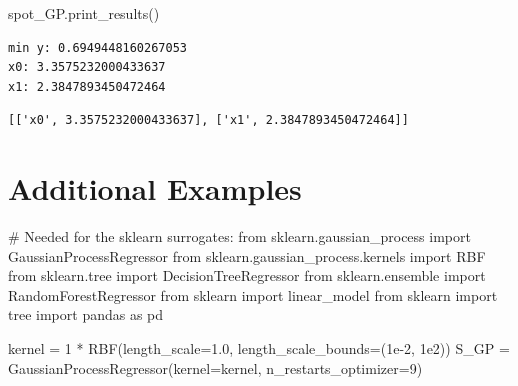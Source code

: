 \documentclass[
  letterpaper,
  DIV=11,
  numbers=noendperiod]{scrreprt}
\newenvironment{Shaded}{\begin{snugshade}}{\end{snugshade}}
\newcommand{\CommentTok}[1]{\textcolor[rgb]{0.37,0.37,0.37}{#1}}
\newcommand{\DecValTok}[1]{\textcolor[rgb]{0.68,0.00,0.00}{#1}}
\newcommand{\FloatTok}[1]{\textcolor[rgb]{0.68,0.00,0.00}{#1}}
\newcommand{\ImportTok}[1]{\textcolor[rgb]{0.00,0.46,0.62}{#1}}
\newcommand{\NormalTok}[1]{\textcolor[rgb]{0.00,0.23,0.31}{#1}}
\newcommand{\OperatorTok}[1]{\textcolor[rgb]{0.37,0.37,0.37}{#1}}
\begin{document}
\begin{Shaded}
\begin{Highlighting}[]
\NormalTok{spot\_GP.print\_results()}
\end{Highlighting}
\end{Shaded}

\begin{verbatim}
min y: 0.6949448160267053
x0: 3.3575232000433637
x1: 2.3847893450472464
\end{verbatim}

\begin{verbatim}
[['x0', 3.3575232000433637], ['x1', 2.3847893450472464]]
\end{verbatim}

\hypertarget{additional-examples}{%
\section{Additional Examples}\label{additional-examples}}

\begin{Shaded}
\begin{Highlighting}[]
\CommentTok{\# Needed for the sklearn surrogates:}
\ImportTok{from}\NormalTok{ sklearn.gaussian\_process }\ImportTok{import}\NormalTok{ GaussianProcessRegressor}
\ImportTok{from}\NormalTok{ sklearn.gaussian\_process.kernels }\ImportTok{import}\NormalTok{ RBF}
\ImportTok{from}\NormalTok{ sklearn.tree }\ImportTok{import}\NormalTok{ DecisionTreeRegressor}
\ImportTok{from}\NormalTok{ sklearn.ensemble }\ImportTok{import}\NormalTok{ RandomForestRegressor}
\ImportTok{from}\NormalTok{ sklearn }\ImportTok{import}\NormalTok{ linear\_model}
\ImportTok{from}\NormalTok{ sklearn }\ImportTok{import}\NormalTok{ tree}
\ImportTok{import}\NormalTok{ pandas }\ImportTok{as}\NormalTok{ pd}
\end{Highlighting}
\end{Shaded}

\begin{Shaded}
\begin{Highlighting}[]
\NormalTok{kernel }\OperatorTok{=} \DecValTok{1} \OperatorTok{*}\NormalTok{ RBF(length\_scale}\OperatorTok{=}\FloatTok{1.0}\NormalTok{, length\_scale\_bounds}\OperatorTok{=}\NormalTok{(}\FloatTok{1e{-}2}\NormalTok{, }\FloatTok{1e2}\NormalTok{))}
\NormalTok{S\_GP }\OperatorTok{=}\NormalTok{ GaussianProcessRegressor(kernel}\OperatorTok{=}\NormalTok{kernel, n\_restarts\_optimizer}\OperatorTok{=}\DecValTok{9}\NormalTok{)}
\end{Highlighting}
\end{Shaded}
\end{document}
